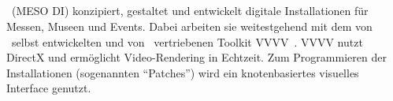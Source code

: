\subsection{\mesodi}
\label{sec:em_meso_digital_initeriors}

\mesodi~(MESO DI) konzipiert, gestaltet
und entwickelt digitale Installationen für Messen, Museen und Events.  Dabei
arbeiten sie weitestgehend mit dem von \meso~selbst entwickelten und von
\mesois~vertriebenen Toolkit VVVV~\cite{v4}.  VVVV nutzt DirectX und ermöglicht
Video-Rendering in Echtzeit.  Zum Programmieren der Installationen (sogenannten
\enquote{Patches}) wird ein knotenbasiertes visuelles Interface genutzt.
